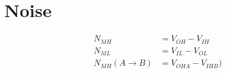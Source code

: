 \section{Noise}
\begin{align}
    N_{MH} &= V_{OH} - V_{IH} \\
    N_{ML} &= V_{IL} - V_{OL} \\
    N_{MH}(A \rightarrow B) &= V_{OHA} - V_{IHB}) 
\end{align}